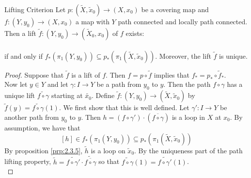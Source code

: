 \documentclass[a4paper]{article}
\begin{document}
\begin{thm}{Lifting Criterion}{} Let $p:(\widetilde{X},\widetilde{x}_0)\to(X,x_0)$ be a covering map and $f:(Y,y_0)\to(X,x_0)$ a map with $Y$ path connected and locally path connected. Then a lift $\widetilde{f}:(Y,y_0)\to(\widetilde{X}_0,x_0)$ of $f$ exists: \\
\\ 
if and only if $f_\ast(\pi_1(Y,y_0))\subseteq p_\ast(\pi_1(\widetilde{X},\widetilde{x}_0))$. Moreover, the lift $\widetilde{f}$ is unique. 
\begin{proof}
Suppose that $\widetilde{f}$ is a lift of $f$. Then $f=p\circ\widetilde{f}$ implies that $f_\ast=p_\ast\circ\widetilde{f}_\ast$. \\

Now let $y\in Y$ and let $\gamma:I\to Y$ be a path from $y_0$ to $y$. Then the path $f\circ\gamma$ has a unique lift $\widetilde{f\circ\gamma}$ starting at $\widetilde{x_0}$. Define $\widetilde{f}:(Y,y_0)\to(\widetilde{X},\widetilde{x}_0)$ by $\widetilde{f}(y)=\widetilde{f\circ\gamma}(1)$. We first show that this is well defined. Let $\gamma':I\to Y$ be another path from $y_0$ to $y$. Then $h=(f\circ\gamma')\cdot(\overline{f\circ\gamma})$ is a loop in $X$ at $x_0$. By assumption, we have that $$[h]\in f_\ast(\pi_1(Y,y_0))\subseteq p_\ast(\pi_1(\widetilde{X},\widetilde{x}_0))$$ By proposition \ref{prp:2.3.5}, $\widetilde{h}$ is a loop on $\widetilde{x}_0$. By the uniqueness part of the path lifting property, $\widetilde{h}=\widetilde{f\circ\gamma'}\cdot\widetilde{\overline{f\circ\gamma}}$ so that $\widetilde{f\circ\gamma}(1)=\widetilde{f\circ\gamma'}(1)$. \\


\end{proof}
\end{thm}
\end{document}
